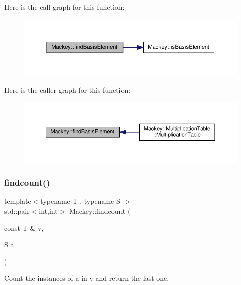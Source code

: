 Here is the call graph for this function\+:\nopagebreak
\begin{figure}[H]
\begin{center}
\leavevmode
\includegraphics[width=350pt]{namespaceMackey_ab5bc349f95c14d448e42622de2d6a448_cgraph}
\end{center}
\end{figure}
Here is the caller graph for this function\+:\nopagebreak
\begin{figure}[H]
\begin{center}
\leavevmode
\includegraphics[width=350pt]{namespaceMackey_ab5bc349f95c14d448e42622de2d6a448_icgraph}
\end{center}
\end{figure}
\mbox{\label{namespaceMackey_a1a7a26880f8c7c087503e2bc16168d3c}} 
\subsubsection{\texorpdfstring{findcount()}{findcount()}}
{\footnotesize\ttfamily template$<$typename T , typename S $>$ \\
std\+::pair$<$int,int$>$ Mackey\+::findcount (\begin{DoxyParamCaption}\item[{const T \&}]{v,  }\item[{S}]{a }\end{DoxyParamCaption})}



Count the instances of a in v and return the last one. 

